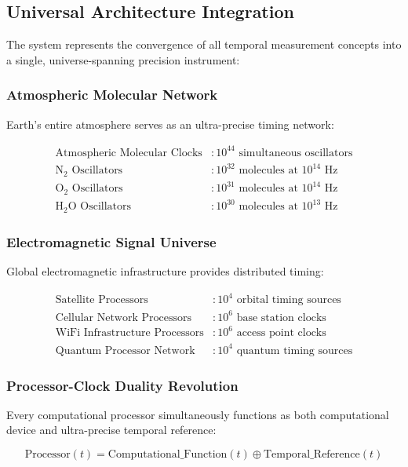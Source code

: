 \documentclass[12pt,a4paper]{article}
\begin{document}
\subsection{Universal Architecture Integration}

The system represents the convergence of all temporal measurement concepts into a single, universe-spanning precision instrument:

\subsubsection{Atmospheric Molecular Network}
Earth's entire atmosphere serves as an ultra-precise timing network:

\begin{align}
\text{Atmospheric Molecular Clocks} &: 10^{44} \text{ simultaneous oscillators} \\
\text{N}_2 \text{ Oscillators} &: 10^{32} \text{ molecules at } 10^{14} \text{ Hz} \\
\text{O}_2 \text{ Oscillators} &: 10^{31} \text{ molecules at } 10^{14} \text{ Hz} \\
\text{H}_2\text{O Oscillators} &: 10^{30} \text{ molecules at } 10^{13} \text{ Hz}
\end{align}

\subsubsection{Electromagnetic Signal Universe}
Global electromagnetic infrastructure provides distributed timing:

\begin{align}
\text{Satellite Processors} &: 10^4 \text{ orbital timing sources} \\
\text{Cellular Network Processors} &: 10^6 \text{ base station clocks} \\
\text{WiFi Infrastructure Processors} &: 10^6 \text{ access point clocks} \\
\text{Quantum Processor Network} &: 10^4 \text{ quantum timing sources}
\end{align}

\subsubsection{Processor-Clock Duality Revolution}
Every computational processor simultaneously functions as both computational device and ultra-precise temporal reference:

\begin{equation}
\text{Processor}(t) = \text{Computational\_Function}(t) \oplus \text{Temporal\_Reference}(t)
\end{equation}
\end{document}
